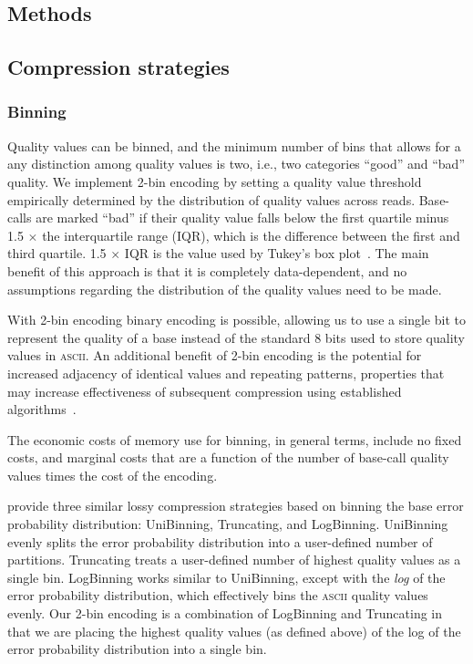 \documentclass{bioinfo}
\begin{document}
\begin{methods}
\section{Methods}

\subsection{Compression strategies}

\subsubsection{Binning}

Quality values can be binned, and the minimum number of bins that
allows for a any distinction among quality values is two, i.e., two
categories ``good'' and ``bad'' quality. We implement 2-bin encoding
by setting a quality value threshold empirically determined by the
distribution of quality values across reads. Base-calls are marked
``bad'' if their quality value falls below the first quartile minus
1.5 $\times$ the interquartile range (IQR), which is the difference
between the first and third quartile. 1.5 $\times$ IQR is the value
used by Tukey's box plot~\citep{mcgill1978variations}. The main
benefit of this approach is that it is completely data-dependent, and
no assumptions regarding the distribution of the quality values need
to be made.
 
With 2-bin encoding binary encoding is possible, allowing us to use a
single bit to represent the quality of a base instead of the standard
8 bits used to store quality values in \textsc{ascii}. An additional
benefit of 2-bin encoding is the potential for increased adjacency of
identical values and repeating patterns, properties that may increase
effectiveness of subsequent compression using established
algorithms~\cite[e.g.,][]{HUFFMAN:1952nr,Ziv77auniversal,
  DBLP:journals/tit/ZivL78}.

The economic costs of memory use for binning, in general terms,
include no fixed costs, and marginal costs that are a function of the
number of base-call quality values times the cost of the encoding.

\cite{Wan:2012kq} provide three similar lossy compression strategies
based on binning the base error probability distribution: UniBinning,
Truncating, and LogBinning. UniBinning evenly splits the error
probability distribution into a user-defined number of partitions.
Truncating treats a user-defined number of highest quality values as a
single bin. LogBinning works similar to UniBinning, except with the
\emph{log} of the error probability distribution, which effectively
bins the \textsc{ascii} quality values evenly. Our 2-bin encoding is
a combination of LogBinning and Truncating in that we are placing the
highest quality values (as defined above) of the log of the error
probability distribution into a single bin.


\end{methods}
\end{document}
